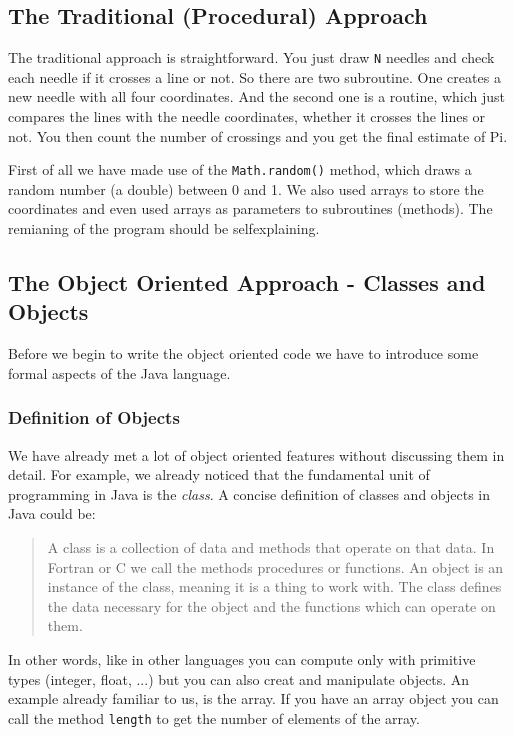 \subsection{The Traditional (Procedural) Approach}
The traditional approach is straightforward. You just
draw \verb|N| needles and check each needle if it crosses a
line or not. So there are two subroutine. One creates a new
needle with all four coordinates. And the second one is a 
routine, which just compares the lines with the needle coordinates,
whether it crosses the lines or not. You then count the number
of crossings and you get the final estimate of Pi.

First of all we have made use of the \verb|Math.random()| method, which
draws a random number (a double) between 0 and 1. We also used arrays
to store the coordinates and even used arrays as parameters to
subroutines (methods). The remianing of the program should be
selfexplaining.

\subsection{The Object Oriented Approach - Classes and Objects}
\label{sec:Classes_and_Objects}
Before we begin to write the object oriented code 
we have to introduce some formal aspects of the Java language.

\subsubsection{Definition of Objects}
We have already met a lot of object oriented features 
without discussing them in detail.  For example, we already noticed
that the fundamental unit of programming in Java is the {\em class}. A
concise definition of classes and objects in Java could be:
\begin{quote}
A class is a collection of data and methods that operate on that data. In
Fortran or C we call the methods procedures or functions. An object
is an instance of the class, meaning it is a thing to work with. The class
defines the data necessary for the object and the functions which can
operate on them.   
\end{quote}

In other words, like in other languages you can compute only with
primitive types (integer, float, ...) but you can also creat and
manipulate objects. An example already familiar to us, is the  array. 
If you have an array 
object you can call the method \verb|length| to get the number of
elements of the array. 

